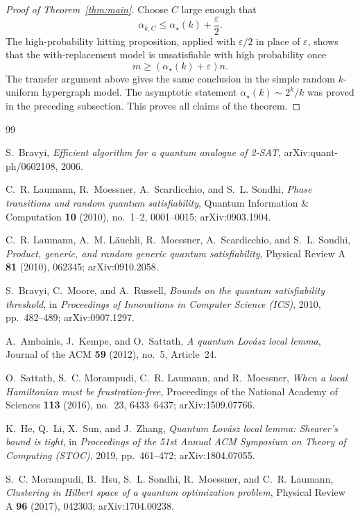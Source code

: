 \documentclass[11pt]{article}
\begin{document}
\begin{proof}[Proof of Theorem~\ref{thm:main}]
Choose \(C\) large enough that
\[
\alpha_{k,C}\le \alpha_\star(k)+\frac{\varepsilon}{2}.
\]
The high-probability hitting proposition, applied with \(\varepsilon/2\) in place of \(\varepsilon\), shows that the with-replacement model is unsatisfiable with high probability once
\[
 m\ge (\alpha_\star(k)+\varepsilon)n.
\]
The transfer argument above gives the same conclusion in the simple random \(k\)-uniform hypergraph model. The asymptotic statement \(\alpha_\star(k)\sim 2^k/k\) was proved in the preceding subsection. This proves all claims of the theorem.
\end{proof}



\begin{thebibliography}{99}

S.~Bravyi,
\emph{Efficient algorithm for a quantum analogue of 2-SAT},
arXiv:quant-ph/0602108, 2006.

C.~R. Laumann, R.~Moessner, A.~Scardicchio, and S.~L. Sondhi,
\emph{Phase transitions and random quantum satisfiability},
Quantum Information \& Computation \textbf{10} (2010), no.~1--2, 0001--0015;
arXiv:0903.1904.

C.~R. Laumann, A.~M. L\"auchli, R.~Moessner, A.~Scardicchio, and S.~L. Sondhi,
\emph{Product, generic, and random generic quantum satisfiability},
Physical Review A \textbf{81} (2010), 062345;
arXiv:0910.2058.

S.~Bravyi, C.~Moore, and A.~Russell,
\emph{Bounds on the quantum satisfiability threshold},
in \emph{Proceedings of Innovations in Computer Science (ICS)}, 2010,
pp.~482--489;
arXiv:0907.1297.

A.~Ambainis, J.~Kempe, and O.~Sattath,
\emph{A quantum Lov\'asz local lemma},
Journal of the ACM \textbf{59} (2012), no.~5, Article~24.

O.~Sattath, S.~C. Morampudi, C.~R. Laumann, and R.~Moessner,
\emph{When a local Hamiltonian must be frustration-free},
Proceedings of the National Academy of Sciences \textbf{113} (2016), no.~23,
6433--6437;
arXiv:1509.07766.

K.~He, Q.~Li, X.~Sun, and J.~Zhang,
\emph{Quantum Lov\'asz local lemma: Shearer's bound is tight},
in \emph{Proceedings of the 51st Annual ACM Symposium on Theory of Computing
(STOC)}, 2019, pp.~461--472;
arXiv:1804.07055.

S.~C. Morampudi, B.~Hsu, S.~L. Sondhi, R.~Moessner, and C.~R. Laumann,
\emph{Clustering in Hilbert space of a quantum optimization problem},
Physical Review A \textbf{96} (2017), 042303;
arXiv:1704.00238.


\end{thebibliography}
\end{document}
